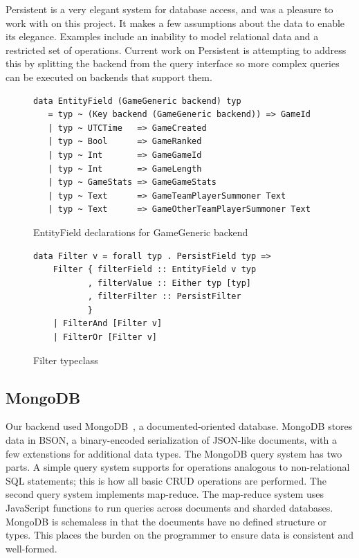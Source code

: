 \documentclass[letterpaper,twocolumn,9pt]{article}
\begin{document}
Persistent is a very elegant system for database access, and was a pleasure to work with on this project.  It makes a few assumptions about the data to enable its elegance.  Examples include an inability to model relational data and a restricted set of operations.  Current work on Persistent is attempting to address this by splitting the backend from the query interface so more complex queries can be executed on backends that support them.

\begin{figure}[]
\scriptsize{
\begin{verbatim}
data EntityField (GameGeneric backend) typ
   = typ ~ (Key backend (GameGeneric backend)) => GameId
   | typ ~ UTCTime   => GameCreated
   | typ ~ Bool      => GameRanked
   | typ ~ Int       => GameGameId
   | typ ~ Int       => GameLength
   | typ ~ GameStats => GameGameStats
   | typ ~ Text      => GameTeamPlayerSummoner Text
   | typ ~ Text      => GameOtherTeamPlayerSummoner Text
\end{verbatim}
}
    \caption{EntityField declarations for GameGeneric backend}
    \label{EntityField}
\end{figure}

\begin{figure}[]
\footnotesize{
\begin{verbatim}
data Filter v = forall typ . PersistField typ =>
    Filter { filterField :: EntityField v typ
           , filterValue :: Either typ [typ]
           , filterFilter :: PersistFilter
           }
    | FilterAnd [Filter v]
    | FilterOr [Filter v]
\end{verbatim}
}
    \caption{Filter typeclass}
    \label{Filter}
\end{figure}

\subsection{MongoDB}

Our backend used MongoDB~\cite{mongo}, a documented-oriented database. MongoDB stores data in BSON, a binary-encoded serialization of JSON-like documents, with a few extenstions for additional data types.  The MongoDB query system has two parts.  A simple query system supports for operations analogous to non-relational SQL statements; this is how all basic CRUD operations are performed.  The second query system implements map-reduce.  The map-reduce system uses JavaScript functions to run queries across documents and sharded databases.  MongoDB is schemaless in that the documents have no defined structure or types.  This places the burden on the programmer to ensure data is consistent and well-formed.
\end{document}
